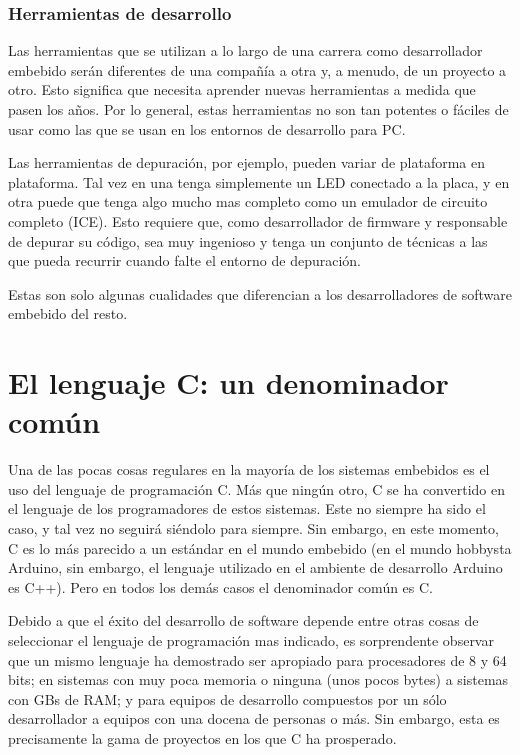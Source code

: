 \documentclass[output=paper, 
colorlinks,
citecolor=brown,
newtxmath
]{langscibook}
\begin{document}
\subsubsection *{Herramientas de desarrollo}

Las herramientas que se utilizan a lo largo de una carrera 
como desarrollador embebido serán diferentes de una compañía a otra y, 
a menudo, de un proyecto a otro. Esto significa que necesita
aprender nuevas herramientas a medida que pasen los años.
Por lo general, estas herramientas no son tan potentes 
o fáciles de usar como las que se usan en los entornos
de desarrollo para PC.

Las herramientas de depuración, por ejemplo, pueden variar de plataforma
en plataforma. Tal vez en una tenga simplemente un LED conectado a la placa,
y en otra puede que tenga algo mucho mas completo como un emulador de 
circuito completo (ICE). Esto requiere que, como desarrollador de 
firmware y responsable de depurar 
su código, sea muy ingenioso y tenga un conjunto de técnicas a las que 
pueda recurrir cuando falte el entorno de depuración. 

Estas son solo algunas cualidades que diferencian a los desarrolladores 
de software embebido del resto.



\section {El lenguaje C: un denominador común}

Una de las pocas cosas regulares en la mayoría de los sistemas embebidos es el uso del 
lenguaje de programación C.
Más que ningún otro, C se ha convertido en el lenguaje de los programadores de estos sistemas. 
Este no siempre ha sido el caso, y tal vez no seguirá siéndolo para siempre. 
Sin embargo, en este momento, C es lo más parecido a un estándar en el mundo embebido (en el mundo hobbysta Arduino, sin embargo, el lenguaje utilizado en el ambiente de desarrollo Arduino es C++). Pero en todos los demás casos el denominador común es C. 

Debido a que el éxito del desarrollo de software depende entre otras cosas de seleccionar 
el lenguaje de programación mas indicado, es sorprendente observar que 
un mismo lenguaje ha demostrado ser apropiado para procesadores de 8 y 64 bits; 
en sistemas con muy poca memoria o ninguna (unos pocos bytes) a sistemas
con GBs de RAM; y para equipos de desarrollo compuestos por un sólo desarrollador 
a equipos con una docena de personas o más. 
Sin embargo, esta es precisamente la gama de proyectos en los que C ha prosperado.
\end{document}
